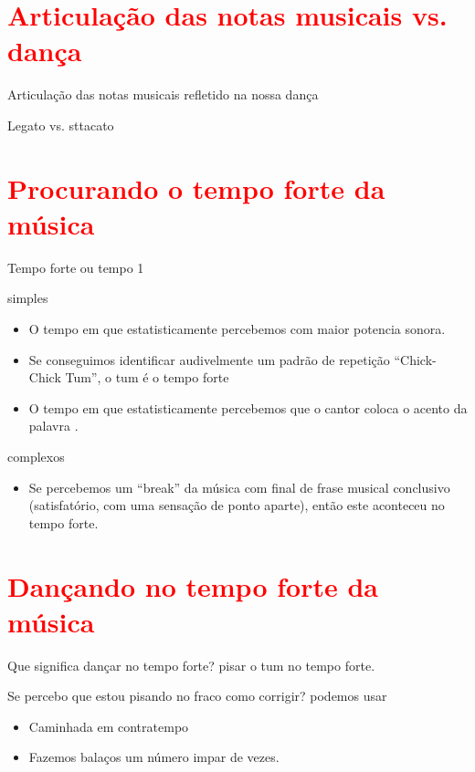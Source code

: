 \section{\textcolor{red}{Articulação das notas musicais vs. dança}}
Articulação das notas musicais refletido na nossa dança

Legato vs. sttacato

\section{\textcolor{red}{Procurando o tempo forte da música}}
Tempo forte ou tempo 1

simples
\begin{itemize}
\item O tempo em que estatisticamente percebemos com maior potencia sonora. 
\item Se conseguimos identificar audivelmente um padrão de repetição ``Chick-Chick Tum'', o tum é o tempo forte
\item O tempo em que estatisticamente percebemos que o cantor  coloca o acento da palavra \cite[pp. 149]{medteoria}. 
\end{itemize}

complexos 
\begin{itemize}
\item Se percebemos um ``break'' da música com final de frase musical conclusivo 
(satisfatório, com uma sensação de ponto aparte), então este aconteceu no tempo forte.
\end{itemize}

\section{\textcolor{red}{Dançando no tempo forte da música}}

Que significa dançar no tempo forte? 
pisar o tum  no tempo forte.

Se percebo que estou pisando no fraco como corrigir?
podemos usar
\begin{itemize}
\item Caminhada em contratempo
\item Fazemos balaços um número impar de vezes.
\end{itemize}


